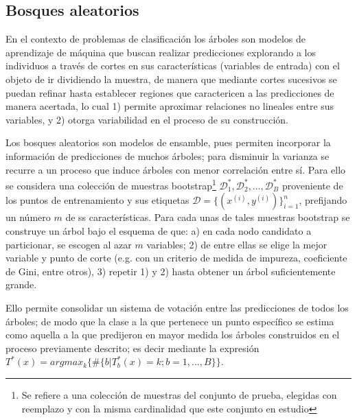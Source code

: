 \documentclass[9pt,twocolumn,twoside]{ilcss}
\begin{document}
\subsection{Bosques aleatorios}

En el contexto de problemas de clasificación los árboles son modelos de aprendizaje de máquina que buscan realizar predicciones explorando a los individuos a través de cortes en sus características (variables de entrada) con el objeto de ir dividiendo la muestra, de manera que mediante cortes sucesivos se puedan refinar hasta establecer regiones que caractericen a las predicciones de manera acertada, lo cual 1) permite aproximar relaciones no lineales entre sus variables, y 2) otorga variabilidad en el proceso de su construcción.

Los bosques aleatorios son modelos de ensamble, pues permiten incorporar la información de predicciones de muchos árboles; para disminuir la varianza se recurre a un proceso que induce árboles con menor correlación entre sí. Para ello se considera una colección de muestras bootstrap\footnote{Se refiere a una colección de muestras del conjunto de prueba, elegidas con reemplazo y con la misma cardinalidad que este conjunto en estudio} ${\mathcal D}_1^*, {\mathcal D}_2^*, \ldots, {\mathcal D}_B^*$ proveniente de los puntos de entrenamiento y sus etiquetas ${\mathcal D} =\{(x^{(i)}, y^{(i)})\}_{i=1}^n$, prefijando un número $m$ de ss características. Para cada unas de tales muestras bootstrap se construye un árbol bajo el esquema de que: a)
en cada nodo candidato a particionar, se escogen al azar $m$ variables; 2) de entre ellas se elige la mejor variable y punto de corte (e.g. con un criterio de medida de impureza, coeficiente de Gini, entre otros), 3) repetir 1) y 2) hasta obtener un árbol suficientemente grande.

Ello permite consolidar un sistema de votación entre las predicciones de todos los árboles; de modo que la clase a la que pertenece un punto específico se estima como aquella a la que predijeron en mayor medida los árboles construidos en el proceso previamente descrito; es decir mediante la expresión $T^*(x) = argmax_k \{ \# \{b |T_b^*(x)=k; b=1,\ldots, B\}\}.$
\end{document}
